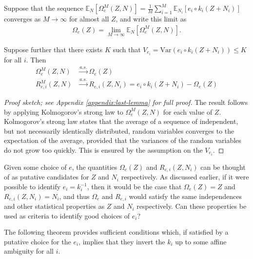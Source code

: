\begin{lemma}\label{lem:last-lemma}
	Suppose that the sequence $\mathbb{E}_{N}[\Omega_{e}^M(Z, N)] = \frac{1}{M}\sum_{i=1}^M \mathbb{E}_{N_i}[{e}_i\circ {k}_i( Z + N_i)] $ converges as $M \to \infty$ for almost all $Z$, and write this limit as
	\begin{align*}
	\Omega_e(Z) = \lim_{M\to\infty}\mathbb{E}_{N}[\Omega_{e}^M(Z, N)].
	\end{align*}
	
	Suppose further that there exists $K$ such that $V_{e_i} = \mathrm{Var}\left({e}_i \circ {k}_i(Z + N_i) \right) \leq K$ for all $i$.
	Then
	\begin{align*}
	\Omega_{e}^M(Z, N) & \overset{a.s.}{\longrightarrow} \Omega_{e}(Z) \\
	R_{e, i}^M(Z, N) & \overset{a.s.}{\longrightarrow} R_{e, i}(Z, N_i) = {e}_i\circ {k}_i( Z + N_i) - \Omega_{e}(Z)
	\end{align*}
\end{lemma}
\begin{proof}[Proof sketch; see Appendix \ref{appendix:last-lemma} for full proof]
The result follows by applying Kolmogorov's strong law to $\Omega_{e}^M(Z, N)$ for each value of $Z$.
Kolmogorov's strong law states that the average of a sequence of independent, but not necessarily identically distributed, random variables converges to the expectation of the average, provided that the variances of the random variables do not grow too quickly. 
This is ensured by the assumption on the $V_{e_i}$.
\end{proof}


Given some choice of ${e}$, the quantities $\Omega_{e}(Z)$ and $R_{e, i}(Z, N_i)$ can be thought of as putative candidates for $Z$ and $N_i$ respectively.
As discussed earlier, if it were possible to identify ${e}_i={k}_i^{-1}$, then it would be the case that $\Omega_{e}(Z) = Z$ and $R_{e, i}(Z, N_i) = N_i$, and thus $\Omega_{e}$ and $R_{e, i}$ would satisfy the same independences and other statistical properties as $Z$ and $N_i$ respectively.
Can these properties be used as criteria to identify good choices of ${e}_i$?

The following theorem provides sufficient conditions which, if satisfied by a putative choice for the $e_i$, implies that they invert the $k_i$ up to some affine ambiguity for all $i$. 


